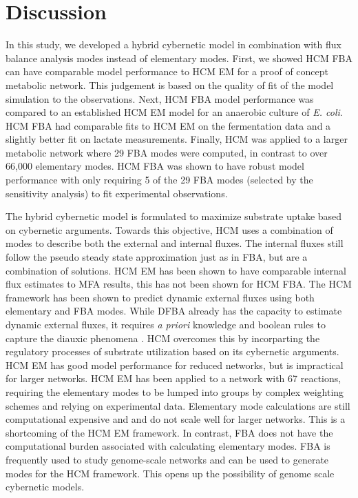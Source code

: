 \documentclass[10pt,twocolumn,twoside,final]{IEEEtran}
\begin{document}
\section{Discussion}
In this study, we developed a hybrid cybernetic model in combination with flux balance analysis modes instead of elementary modes.
First, we showed HCM FBA can have comparable model performance to HCM EM for a proof of concept metabolic network.
This judgement is based on the quality of fit of the model simulation to the observations.
Next, HCM FBA model performance was compared to an established HCM EM model\cite{2008_kim_varner_ramkrishna_BiotechProg} for an anaerobic culture of \textit{E. coli}.
HCM FBA had comparable fits to HCM EM on the fermentation data and a slightly better fit on lactate measurements.
Finally, HCM was applied to a larger metabolic network where 29 FBA modes were computed, in contrast to over 66,000 elementary modes.
HCM FBA was shown to have robust model performance with only requiring 5 of the 29 FBA modes (selected by the sensitivity analysis) to fit experimental observations.

The hybrid cybernetic model is formulated to maximize substrate uptake based on cybernetic arguments.
Towards this objective, HCM uses a combination of modes to describe both the external and internal fluxes.
The internal fluxes still follow the pseudo steady state approximation just as in FBA, but are a combination of solutions.
HCM EM has been shown to have comparable internal flux estimates to MFA results\cite{2008_kim_varner_ramkrishna_BiotechProg}, this has not been shown for HCM FBA.
The HCM framework has been shown to predict dynamic external fluxes using both elementary and FBA modes.
While DFBA already has the capacity to estimate dynamic external fluxes, it requires \textit{a priori} knowledge and boolean rules to capture the diauxic phenomena \cite{1994_varma_palsson_ApplEnvMicro,2002_Mahadevan_BiophysJ,2001_covert_schilling_palsson}.
HCM overcomes this by incorparting the regulatory processes of substrate utilization based on its cybernetic arguments.
HCM EM has good model performance for reduced networks, but is impractical for larger networks.
HCM EM has been applied to a network with 67 reactions, requiring the elementary modes to be lumped into groups by complex weighting schemes and relying on experimental data\cite{2010_song_ramkrishna}.
Elementary mode calculations are still computational expensive and and do not scale well for larger networks\cite{2004_lee_varner_ko_ieee}.
This is a shortcoming of the HCM EM framework.
In contrast, FBA does not have the computational burden associated with calculating elementary modes.
FBA is frequently used to study genome-scale networks\cite{2010_orth_NatBiotech} and can be used to generate modes for the HCM framework.
This opens up the possibility of genome scale cybernetic models.
\end{document}
